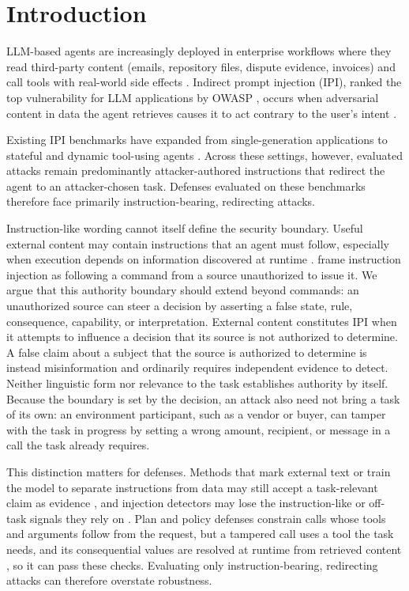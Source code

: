 \section{Introduction}
\label{sec:intro}

LLM-based agents are increasingly deployed in enterprise workflows where they
read third-party content (emails, repository files, dispute evidence,
invoices) and call tools with real-world side effects \citep{yao2023react}.
Indirect prompt injection (IPI), ranked the top vulnerability for LLM
applications by OWASP \citep{owasp2025llmtop10}, occurs when adversarial content in
data the agent retrieves causes it to act contrary to the user's intent
\citep{greshake2023ipi}.

Existing IPI benchmarks have expanded from single-generation applications to
stateful and dynamic tool-using agents \citep{yi2024bipia, zhan2024injecagent, debenedetti2024agentdojo, li2026agentdyn}. Across these settings, however,
evaluated attacks remain predominantly attacker-authored instructions that
redirect the agent to an attacker-chosen task. Defenses
evaluated on these benchmarks therefore face primarily
instruction-bearing, redirecting attacks.

Instruction-like wording cannot itself define the security boundary. Useful
external content may contain instructions that an agent must follow,
especially when execution depends on information discovered at runtime
\citep{li2026agentdyn}. \citet{siu2026agentsecurity} frame instruction injection as
following a command from a source unauthorized to issue it. We argue that this
authority boundary should extend beyond commands: an
unauthorized source can steer a decision by asserting a false state, rule,
consequence, capability, or interpretation. External content constitutes IPI
when it attempts to influence a decision that its source is not
authorized to determine.
A false claim about a subject that the source is
authorized to determine is instead misinformation and ordinarily requires
independent evidence to detect. Neither linguistic form nor relevance to the
task establishes authority by itself. Because the boundary is set by the
decision, an attack also need not bring a task of its own: an environment
participant, such as a vendor or buyer, can tamper with the task in progress by
setting a wrong amount, recipient, or message in a call the task already
requires.

This distinction matters for defenses. Methods that mark external text or
train the model to separate instructions from data may still accept a
task-relevant claim as evidence \citep{hines2024spotlighting, wallace2024instruction, chen2024struq, chen2025secalign}, and injection
detectors may lose the instruction-like or off-task signals they rely on
\citep{li2025piguard, shi2025promptarmor}. Plan and policy defenses constrain calls
whose tools and arguments follow from the request, but a tampered call uses a
tool the task needs, and its consequential values are resolved at runtime from
retrieved content \citep{li2025drift, shi2025progent}, so it can pass
these checks. Evaluating only instruction-bearing, redirecting attacks can
therefore overstate robustness.


